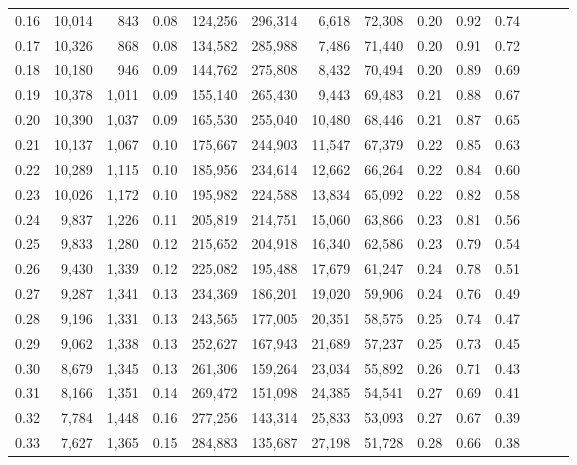 \begin{tabular}{rrrrrrrrrrrrrr}
0.16 &  10,014 &    843 &  0.08 &  124,256 &  296,314 &   6,618 &  72,308 &  0.20 &  0.92 &      0.74 \\
0.17 &  10,326 &    868 &  0.08 &  134,582 &  285,988 &   7,486 &  71,440 &  0.20 &  0.91 &      0.72 \\
0.18 &  10,180 &    946 &  0.09 &  144,762 &  275,808 &   8,432 &  70,494 &  0.20 &  0.89 &      0.69 \\
0.19 &  10,378 &  1,011 &  0.09 &  155,140 &  265,430 &   9,443 &  69,483 &  0.21 &  0.88 &      0.67 \\
0.20 &  10,390 &  1,037 &  0.09 &  165,530 &  255,040 &  10,480 &  68,446 &  0.21 &  0.87 &      0.65 \\
0.21 &  10,137 &  1,067 &  0.10 &  175,667 &  244,903 &  11,547 &  67,379 &  0.22 &  0.85 &      0.63 \\
0.22 &  10,289 &  1,115 &  0.10 &  185,956 &  234,614 &  12,662 &  66,264 &  0.22 &  0.84 &      0.60 \\
0.23 &  10,026 &  1,172 &  0.10 &  195,982 &  224,588 &  13,834 &  65,092 &  0.22 &  0.82 &      0.58 \\
0.24 &   9,837 &  1,226 &  0.11 &  205,819 &  214,751 &  15,060 &  63,866 &  0.23 &  0.81 &      0.56 \\
0.25 &   9,833 &  1,280 &  0.12 &  215,652 &  204,918 &  16,340 &  62,586 &  0.23 &  0.79 &      0.54 \\
0.26 &   9,430 &  1,339 &  0.12 &  225,082 &  195,488 &  17,679 &  61,247 &  0.24 &  0.78 &      0.51 \\
0.27 &   9,287 &  1,341 &  0.13 &  234,369 &  186,201 &  19,020 &  59,906 &  0.24 &  0.76 &      0.49 \\
0.28 &   9,196 &  1,331 &  0.13 &  243,565 &  177,005 &  20,351 &  58,575 &  0.25 &  0.74 &      0.47 \\
0.29 &   9,062 &  1,338 &  0.13 &  252,627 &  167,943 &  21,689 &  57,237 &  0.25 &  0.73 &      0.45 \\
0.30 &   8,679 &  1,345 &  0.13 &  261,306 &  159,264 &  23,034 &  55,892 &  0.26 &  0.71 &      0.43 \\
0.31 &   8,166 &  1,351 &  0.14 &  269,472 &  151,098 &  24,385 &  54,541 &  0.27 &  0.69 &      0.41 \\
0.32 &   7,784 &  1,448 &  0.16 &  277,256 &  143,314 &  25,833 &  53,093 &  0.27 &  0.67 &      0.39 \\
0.33 &   7,627 &  1,365 &  0.15 &  284,883 &  135,687 &  27,198 &  51,728 &  0.28 &  0.66 &      0.38 \\

\end{tabular}
